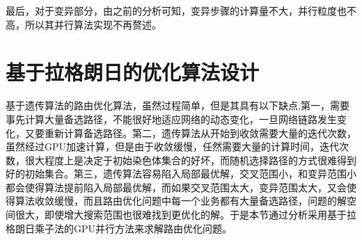 最后，对于变异部分，由之前的分析可知，变异步骤的计算量不大，并行粒度也不高，所以其并行算法实现不再赘述。
\section{基于拉格朗日的优化算法设计}

基于遗传算法的路由优化算法，虽然过程简单，但是其具有以下缺点,第一，需要事先计算大量备选路径，不能很好地适应网络的动态变化，一旦网络链路发生变化，又要重新计算备选路径。第二，遗传算法从开始到收敛需要大量的迭代次数，虽然经过GPU加速计算，但是由于收敛缓慢，任然需要大量的计算时间，迭代次数，很大程度上是决定于初始染色体集合的好坏，而随机选择路径的方式很难得到好的初始集合。第三，遗传算法容易陷入局部最优解，交叉范围小，和变异范围小都会使得算法提前陷入局部最优解，而如果交叉范围太大，变异范围太大，又会使得算法收敛缓慢，而且路由优化问题中每一个业务都有大量备选路径，问题的解空间很大，即使增大搜索范围也很难找到更优化的解。于是本节通过分析采用基于拉格朗日乘子法的GPU并行方法来求解路由优化问题。

